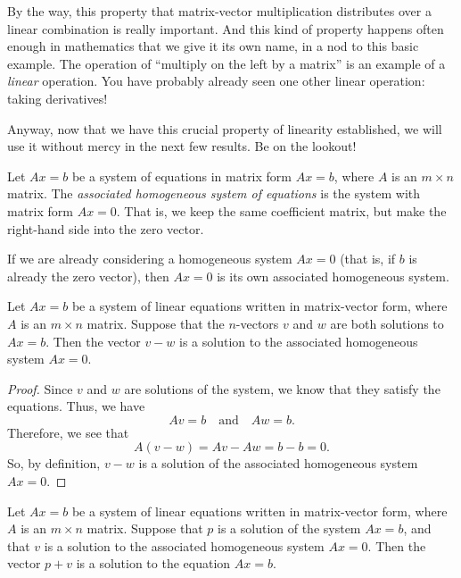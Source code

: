 \documentclass[00-livre-main.tex]{subfiles}
\begin{document}
By the way, this property that matrix-vector multiplication distributes over a linear combination is really important. And this kind of property happens often enough in mathematics that we give it its own name, in a nod to this basic example. The operation of ``multiply on the left by a matrix'' is an example of a \emph{linear} operation. You have probably already seen one other linear operation: taking derivatives!

Anyway, now that we have this crucial property of linearity established, we will use it without mercy in the next few results. Be on the lookout!


\begin{definition}
Let $Ax=b$ be a system of equations in matrix form $Ax=b$, where $A$ is an $m\times n$ matrix. The \emph{associated homogeneous system of equations} is the system with matrix form $Ax=0$. That is, we keep the same coefficient matrix, but make the right-hand side into the zero vector. 

If we are already considering a homogeneous system $Ax=0$ (that is, if $b$ is already the zero vector), then $Ax=0$ is its own associated homogeneous system.
\end{definition}

\begin{theorem}\label{thm:diff-of-solns}
Let $Ax=b$ be a system of linear equations written in matrix-vector form, where $A$ is an $m\times n$ matrix.
Suppose that the $n$-vectors $v$ and $w$ are both solutions to $Ax=b$. Then the vector $v-w$ is a solution to the associated homogeneous system $Ax=0$.
\end{theorem}

\begin{proof} Since $v$ and $w$ are solutions of the system, we know that they satisfy the equations. Thus, we have
\[
Av=b \quad \text{and} \quad Aw=b.
\]
Therefore, we see that
\[
A(v-w) = Av - Aw = b - b = 0.
\]
So, by definition, $v-w$ is a solution of the associated homogeneous system $Ax=0$.
\end{proof}

\begin{theorem}\label{thm:sum-of-solns}
Let $Ax=b$ be a system of linear equations written in matrix-vector form, where $A$ is an $m\times n$ matrix.
Suppose that $p$ is a solution of the system $Ax=b$, and that $v$ is a solution to the associated homogeneous system $Ax=0$. Then the vector $p+v$ is a solution to the equation $Ax=b$.
\end{theorem}
\end{document}
